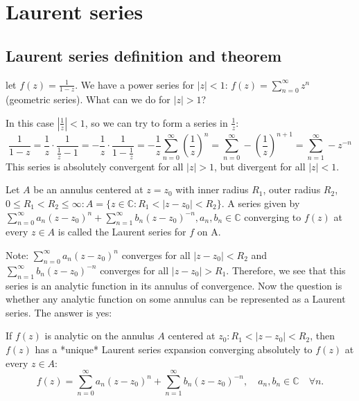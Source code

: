 \section{Laurent series}

\subsection{Laurent series definition and theorem}
\begin{example}\label{example:15.8} let $f(z) = \frac{1}{1-z}$. We have a power series for $|z| < 1$: $f(z) = \sum_{n=0}^{\infty} z^n$ (geometric series). What can we do for $|z| > 1$?

In this case $|\frac{1}{z}| < 1$, so we can try to form a series in $\frac{1}{z}$:
\[ \frac{1}{1-z} = \frac{1}{z} \cdot \frac{1}{\frac{1}{z} - 1} = -\frac{1}{z} \cdot \frac{1}{1 - \frac{1}{z}} = -\frac{1}{z} \sum_{n=0}^{\infty} \left(\frac{1}{z}\right)^n = \sum_{n=0}^{\infty} -\left(\frac{1}{z}\right)^{n+1} = \sum_{n=1}^{\infty} -z^{-n} \]
This series is absolutely convergent for all $|z| > 1$, but divergent for all $|z| < 1$.
\end{example}

\begin{definition}\label{definition:13.1} Let $A$ be an annulus centered at $z = z_0$ with inner radius $R_1$, outer radius $R_2$, $0 \leq R_1 < R_2 \leq \infty: A = \{z \in \mathbb{C}: R_1 < |z - z_0| < R_2\}$. A series given by $\sum_{n=0}^{\infty} a_n (z - z_0)^n + \sum_{n=1}^{\infty} b_n (z - z_0)^{-n}, a_n, b_n \in \mathbb{C}$ converging to $f(z)$ at every $z \in A$ is called the Laurent series for $f$ on A.
\end{definition}

Note: $\sum_{n=0}^{\infty} a_n (z - z_0)^n$ converges for all $|z - z_0| < R_2$ and $\sum_{n=1}^{\infty} b_n (z - z_0)^{-n}$ converges for all $|z - z_0| > R_1$. Therefore, we see that this series is an analytic function in its annulus of convergence. Now the question is whether any analytic function on some annulus can be represented as a Laurent series. The answer is yes:

\begin{theorem}\label{theorem:13.2}
 If $f(z)$ is analytic on the annulus $A$ centered at $z_0: R_1 < |z - z_0| < R_2$, then $f(z)$ has a *unique* Laurent series expansion converging absolutely to $f(z)$ at every $z \in A$:
    \[ f(z) = \sum_{n=0}^{\infty} a_n (z - z_0)^n + \sum_{n=1}^{\infty} b_n (z - z_0)^{-n}, \quad a_n, b_n \in \mathbb{C} \quad \forall n. \]
\end{theorem}

